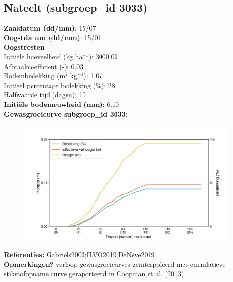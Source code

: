\documentclass{article}
\begin{document}
 \subsection{Nateelt (subgroep\_id 3033)} 
  \textbf{Zaaidatum (dd/mm)}: 15/07  \vspace{0.10cm} \\ 
  \textbf{Oogstdatum (dd/mm)}: 15/01  \vspace{0.10cm} \\ 
  \textbf{Oogstresten} \vspace{0.05cm} \\ 
  \tab Initi\"{e}le hoeveelheid (kg ha$^{-1}$): 3000.00 \vspace{0.05cm} \\ 
  \tab Afbraakcoefficient (-): 0.03 \vspace{0.05cm} \\ 
  \tab Bodembedekking (m$^2$ kg$^{-1}$): 1.07 \vspace{0.05cm} \\ 
  \tab Initieel percentage bedekking (\%): 28 \vspace{0.05cm} \\ 
  \tab Halfwaarde tijd (dagen): 10 \vspace{0.05cm} \\ 
  \textbf{Initi\"{e}le bodemruwheid (mm)}: 6.10 \vspace{0.05cm} \\ 
  \textbf{Gewasgroeicurve subgroep\_id 3033:} 
 \begin{center} \begin{figure}[H] \includegraphics[width=12.5cm]{temp/3033.png} \end{figure} \end{center} 
  \textbf{Referenties:} Gabriels2003;ILVO2019;DeNeve2019 \vspace{0.10cm} \\ 
  \textbf{Opmerkingen?} verloop gewasgroeicurves geinterpoleerd met cumulatieve stikstofopname curve geraporteerd in Coopman et al. (2013) \vspace{0.10cm} \\ 
 \newpage 
\end{document}
